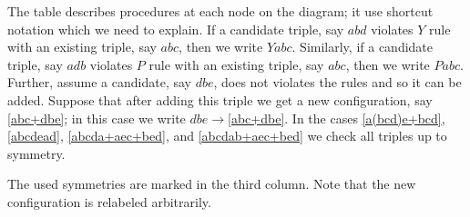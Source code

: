 \documentclass{article}
\begin{document}
The table describes procedures at each node on the diagram;
it use shortcut notation which we need to explain.
If a candidate triple, say $abd$ violates $Y$ rule with an existing triple, say $abc$, then we write $Yabc$.
Similarly, if a candidate triple, say $adb$ violates $P$ rule with an existing triple, say $abc$, then we write $Pabc$.
Further, assume a candidate, say $dbe$, does not violates the rules and so it can be added.
Suppose that after adding this triple we get a new configuration, say \ref{abc+dbe};
in this case we write $dbe{\to}$\ref{abc+dbe}.
In the cases \ref{a(bcd)e+bcd}, \ref{abcdead}, \ref{abcda+aec+bed}, and \ref{abcdab+aec+bed} we check all triples up to symmetry.

The used symmetries are marked in the third column.
Note that the new configuration is relabeled arbitrarily.


\medskip

\setcounter{foo}{0}
\newcommand{\myitem}{\refstepcounter{foo}\thefoo}
\end{document}
